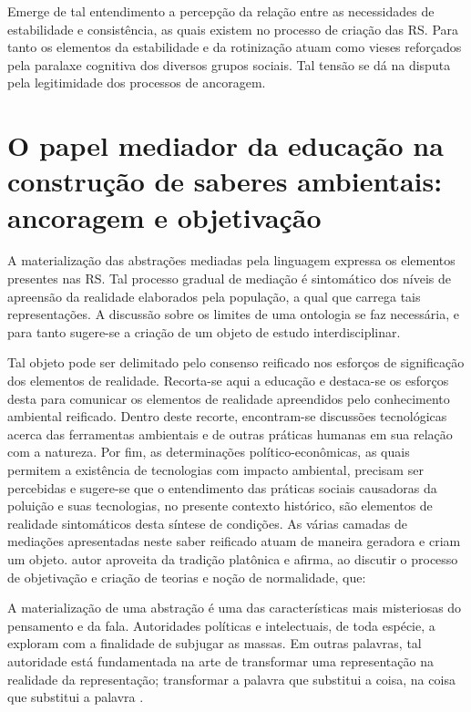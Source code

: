 \documentclass[
  12pt,       %
  openright,      %
  twoside,      %
  a4paper,      %
  english,      %
  french,       %
  spanish,      %
  brazil        %
  ]{abntex2}
\begin{document}
Emerge de tal entendimento a percepção da relação entre as necessidades de estabilidade e consistência, as quais existem no processo de criação das RS. Para tanto os elementos da estabilidade e da rotinização atuam como vieses reforçados pela paralaxe cognitiva dos diversos grupos sociais. Tal tensão se dá na disputa pela legitimidade dos processos de ancoragem.


\section{O papel mediador da educação na construção de saberes ambientais: ancoragem e objetivação}

A materialização das abstrações mediadas pela linguagem expressa os elementos presentes nas RS. Tal processo gradual de mediação é sintomático dos níveis de apreensão da realidade elaborados pela população, a qual que carrega tais representações. A discussão sobre os limites de uma ontologia se faz necessária, e para tanto sugere-se a criação de um objeto de estudo interdisciplinar.

Tal objeto pode ser delimitado pelo consenso reificado nos esforços de significação dos elementos de realidade. Recorta-se aqui a educação e destaca-se os esforços desta para comunicar os elementos de realidade apreendidos pelo conhecimento ambiental reificado. Dentro deste recorte, encontram-se discussões tecnológicas acerca das ferramentas ambientais e de outras práticas humanas em sua relação com a natureza. Por fim, as determinações político-econômicas, as quais permitem a existência de tecnologias com impacto ambiental, precisam ser percebidas e sugere-se que o entendimento das práticas sociais causadoras da poluição e suas tecnologias, no presente contexto histórico, são elementos de realidade sintomáticos desta síntese de condições. As várias camadas de mediações apresentadas neste saber reificado atuam de maneira geradora e criam um objeto.  autor aproveita da tradição platônica e afirma, ao discutir o processo de objetivação e criação de teorias e noção de normalidade, que:

\begin{citacao}
A materialização de uma abstração é uma das características
mais misteriosas do pensamento e da fala. Autoridades políticas e
intelectuais, de toda espécie, a exploram com a finalidade de 
subjugar as massas.  Em outras palavras, tal autoridade está 
fundamentada na arte de transformar uma representação na realidade
da representação; transformar a palavra que substitui a coisa, na
coisa que substitui a palavra \cite[p.78]{Representacees_sociais_moscovici}.
\end{citacao}
\end{document}
